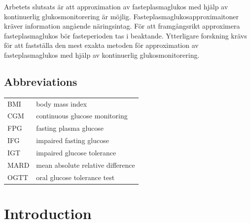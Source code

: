 \documentclass[english, 12pt, a4paper, elec, utf8, a-1b, online]{aaltothesis}
\begin{document}
\begin{abstractpage}[swedish]
Arbetets slutsats \"{a}r att approximation av fasteplasmaglukos med hj\"{a}lp av kontinuerlig glukosmonitorering \"{a}r m\"{o}jlig. Fasteplasmaglukosapproximaitoner kr\"{a}ver information ang\aa ende n\"{a}ringsintag. F\"{o}r att framg\aa ngsrikt approximera fasteplasmaglukos b\"{o}r fasteperioden tas i beaktande. Ytterligare forskning kr\"{a}vs f\"{o}r att fastst\"{a}lla den mest exakta metoden f\"{o}r approximation av fasteplasmaglukos med hj\"{a}lp av kontinuerlig glukosmonitorering. 
\end{abstractpage}




\thesistableofcontents



\subsection*{Abbreviations}

\begin{tabular}{ll}
BMI         & body mass index \\
CGM      & continuous glucose monitoring \\
FPG        & fasting plasma glucose \\
IFG         & impaired fasting glucose \\
IGT         & impaired glucose tolerance \\
MARD        &  mean absolute relative difference \\
OGTT        & oral glucose tolerance test \\
\end{tabular}

\cleardoublepage



\section{Introduction}
\thispagestyle{empty}
\end{document}
